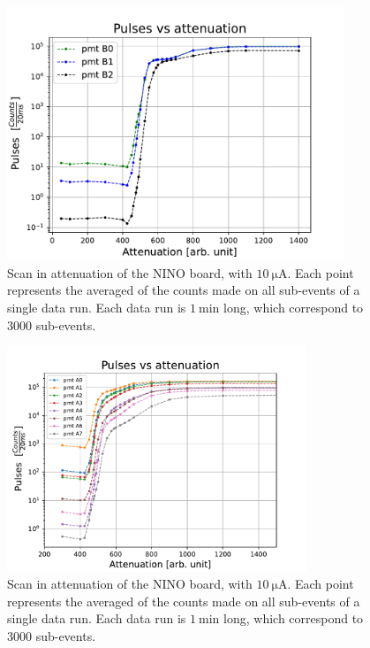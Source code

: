 \begin{figure}[!hbtp]
\centering
\includegraphics[width = 0.9\textwidth]{Analysis/CalibrationPMT/AttenuationScanB.pdf}
\caption{Scan in attenuation of the NINO board, with $\SI{10}{\micro \ampere}$. Each point represents the averaged of the counts made on all sub-events of a single data run. Each data run is $\SI{1}{\minute}$ long, which correspond to $3000$ sub-events.}
\label{fig:AttScanB}
\end{figure}

\begin{figure}[hbtp]
\centering
{}
\includegraphics[width = 0.8\textwidth]{Analysis/CalibrationPMT/AttenuationScanA.pdf}
\caption{Scan in attenuation of the NINO board, with $\SI{10}{\micro \ampere}$. Each point represents the averaged of the counts made on all sub-events of a single data run. Each data run is $\SI{1}{\minute}$ long, which correspond to $3000$ sub-events.}\label{fig:AttScan}
\end{figure}

